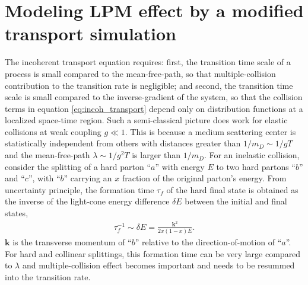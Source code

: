 \documentclass[aps, prc, reprint, amsmath, groupedaddress, nofootinbib]{revtex4-1}
\begin{document}
\section{Modeling LPM effect by a modified transport simulation}\label{section:modified-Boltzmann}
The incoherent transport equation requires: first, the transition time scale of a process is small compared to the mean-free-path, so that multiple-collision contribution to the transition rate is negligible; and second, the transition time scale is small compared to the inverse-gradient of the system, so that the collision terms in equation \ref{eq:incoh_transport} depend only on distribution functions at a localized space-time region.
Such a semi-classical picture does work for elastic collisions at weak coupling $g\ll 1$. 
This is because a medium scattering center is statistically independent from others with distances greater than $1/m_D\sim 1/gT$ and the mean-free-path $\lambda \sim 1/g^2T$ is larger than $1/m_D$.
For an inelastic collision, consider the splitting of a hard parton ``$a$'' with energy $E$ to two hard partons ``$b$'' and ``$c$'', with ``$b$'' carrying an $x$ fraction of the original parton's energy.
From uncertainty principle, the formation time $\tau_f$ of the hard final state is obtained as the inverse of the light-cone energy difference $\delta E$ between the initial and final states,
\begin{eqnarray}
\tau_f^{-1} \sim \delta E = \frac{\mathbf{k}^2}{2x(1-x)E}.
\label{eq:tauf}
\end{eqnarray}
$\mathbf{k}$ is the transverse momentum of ``$b$'' relative to the direction-of-motion of ``$a$''.
For hard and collinear splittings, this formation time can be very large compared to $\lambda$ and multiple-collision effect becomes important and needs to be resummed into the transition rate.
\end{document}
